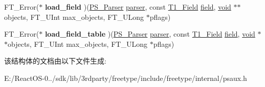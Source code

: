 \begin{DoxyCompactItemize}
\item 
\mbox{\label{struct_p_s___parser___funcs_rec___a33c37608a63a065ee93fd346a44f0404}} 
F\+T\+\_\+\+Error($\ast$ {\bfseries load\+\_\+field} )(\hyperlink{struct_p_s___parser_rec__}{P\+S\+\_\+\+Parser} \hyperlink{structparser}{parser}, const \hyperlink{struct_t1___field_rec__}{T1\+\_\+\+Field} \hyperlink{structfield}{field}, \hyperlink{interfacevoid}{void} $\ast$$\ast$objects, F\+T\+\_\+\+U\+Int max\+\_\+objects, F\+T\+\_\+\+U\+Long $\ast$pflags)
\item 
\mbox{\label{struct_p_s___parser___funcs_rec___a0952dd98193c4f73fe0a1281188ad395}} 
F\+T\+\_\+\+Error($\ast$ {\bfseries load\+\_\+field\+\_\+table} )(\hyperlink{struct_p_s___parser_rec__}{P\+S\+\_\+\+Parser} \hyperlink{structparser}{parser}, const \hyperlink{struct_t1___field_rec__}{T1\+\_\+\+Field} \hyperlink{structfield}{field}, \hyperlink{interfacevoid}{void} $\ast$$\ast$objects, F\+T\+\_\+\+U\+Int max\+\_\+objects, F\+T\+\_\+\+U\+Long $\ast$pflags)
\end{DoxyCompactItemize}


该结构体的文档由以下文件生成\+:\begin{DoxyCompactItemize}
\item 
E\+:/\+React\+O\+S-\/0../sdk/lib/3rdparty/freetype/include/freetype/internal/psaux.\+h\end{DoxyCompactItemize}
